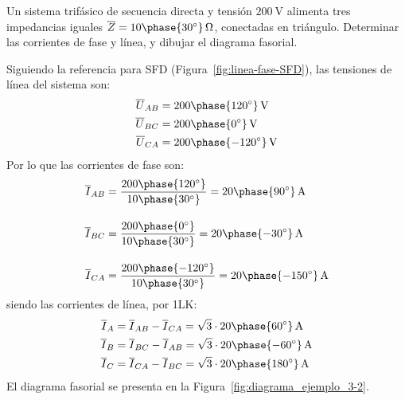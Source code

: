 	\vspace{4mm}
        \begin{example}\label{ej.3-2}
          Un sistema trifásico de secuencia directa y tensión
          $\qty{200}{\volt}$ alimenta tres impedancias iguales
          $\overline{Z}=10\phase{30^\circ}\,\Omega$, conectadas en
          triángulo. Determinar las corrientes de fase y línea, y
          dibujar el diagrama fasorial.

          \vspace{1mm} \hspace*{-5mm}\hrulefill
        
          \vspace{4mm}
    
          Siguiendo la referencia para SFD
          (Figura~\ref{fig:linea-fase-SFD}), las tensiones de línea
          del sistema son:
          \begin{align*}
            \overline{U}_{AB}&=200\phase{120^\circ}\,\si{\volt}\\
            \overline{U}_{BC}&=200\phase{0^\circ}\,\si{\volt}\\
            \overline{U}_{CA}&=200\phase{-120^\circ}\,\si{\volt}
          \end{align*}
          Por lo que las corrientes de fase son:
          \begin{align*}
            \overline{I}_{AB} &= \frac{200\phase{120^\circ}}{10\phase{30^\circ}} =20\phase{90^\circ} \,\si{\ampere} \\[10pt]
            \overline{I}_{BC} &= \frac{200\phase{0^\circ}}{10\phase{30^\circ}} = 20\phase{-30^\circ} \,\si{\ampere}\\[10pt]
            \overline{I}_{CA} &=\frac{200\phase{-120^\circ}}{10\phase{30^\circ}} = 20\phase{-150^\circ} \,\si{\ampere}
          \end{align*}
          siendo las corrientes de línea, por 1LK:
          \begin{align*}
            \overline{I}_A&= \overline{I}_{AB}-\overline{I}_{CA} = \sqrt{3}\cdot 20\phase{60^\circ}\,\si{\ampere}\\
            \overline{I}_B&= \overline{I}_{BC}-\overline{I}_{AB} = \sqrt{3}\cdot 20\phase{-60^\circ}\,\si{\ampere}\\
            \overline{I}_C&= \overline{I}_{CA}-\overline{I}_{BC} = \sqrt{3}\cdot 20\phase{180^\circ}\,\si{\ampere}
          \end{align*}
          El diagrama fasorial se presenta en la
          Figura~\ref{fig:diagrama_ejemplo_3-2}.

\end{example}

